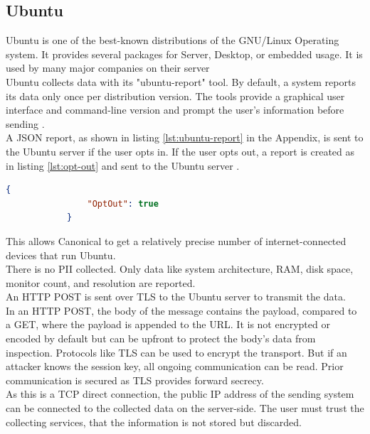     \subsection{Ubuntu}
        Ubuntu is one of the best-known distributions of the GNU/Linux Operating system. It provides several packages for Server, Desktop, or embedded usage. It is used by many major companies on their server \cite{canonical_enterprise_nodate}\\
        Ubuntu collects data with its "ubuntu-report" tool. By default, a system reports its data only once per distribution version. The tools provide a graphical user interface and command-line version and prompt the user's information before sending \cite{roche_ubuntuubuntu-report_2020}.\\
        A JSON report, as shown in listing \ref{lst:ubuntu-report} in the Appendix, is sent to the Ubuntu server if the user opts in. If the user opts out, a report is created as in listing \ref{lst:opt-out} and sent to the Ubuntu server \cite{roche_ubuntuubuntu-report_2020}.\\ 
        \begin{lstlisting}[language=json, caption=JSON report on opt out, label=lst:opt-out]
            {
                "OptOut": true
            }
        \end{lstlisting}
        This allows Canonical to get a relatively precise number of internet-connected devices that run Ubuntu.\\
        There is no PII collected. Only data like system architecture, RAM, disk space, monitor count, and resolution are reported.\\
        An HTTP POST is sent over TLS to the Ubuntu server to transmit the data.\\
        
        In an HTTP POST, the body of the message contains the payload, compared to a GET, where the payload is appended to the URL.
        It is not encrypted or encoded by default but can be upfront to protect the body's data from inspection. Protocols like TLS can be used to encrypt the transport. But if an attacker knows the session key, all ongoing communication can be read. Prior communication is secured as TLS provides forward secrecy.\\
        
        As this is a TCP direct connection, the public IP address of the sending system can be connected to the collected data on the server-side.
        The user must trust the collecting services, that the information is not stored but discarded.\\
        
